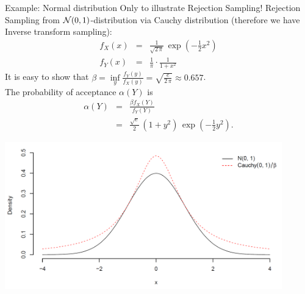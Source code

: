 \documentclass[11pt,compress,t,notes=noshow, xcolor=table]{beamer}
\begin{document}
\begin{vbframe}{Example: Normal distribution}
Only to illustrate Rejection Sampling!
Rejection Sampling from $\mathcal{N}(0,1)$-distribution via
Cauchy distribution (therefore we have Inverse transform sampling):
    \begin{eqnarray*}
        f_X(x) & = & \frac{1}{\sqrt{2\,\pi}} \,
            \exp(-\frac{1}{2}x^2) \\
        f_Y(x) & = & \frac{1}{\pi} \cdot \frac{1}{1 + x^2}
    \end{eqnarray*}
    It is easy to show that $\beta = \inf\limits_y \frac{f_Y(y)}{f_X(y)}
    = \sqrt{\frac{e}{2\,\pi}} \approx 0.657$. \\
    The probability of acceptance $\alpha(Y)$ is
    \begin{eqnarray*}
    \alpha(Y) &=& \frac{\beta f_X(Y)}{ f_Y(Y)} \\
              &=&  \frac{\sqrt{e}}{2} \, (1 + y^2) \,
                    \exp(-\frac{1}{2}y^2).
    \end{eqnarray*}

\framebreak

\lz

\begin{center}
\includegraphics[width =0.9\textwidth]{figure_man/example.png}
\end{center}




\framebreak
\lz


\end{vbframe}
\end{document}
